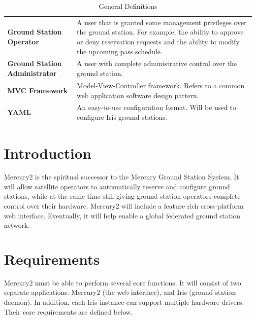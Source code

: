 \documentclass{mxl-note}
\begin{document}
\begin{table}[h]
{\begin{tabular}{ p{5cm} p{10cm} }
		\textbf{Ground Station Operator} & A user that is granted some management privileges over the ground station. For example, the ability to approve or deny reservation requests and the ability to modify the upcoming pass schedule.\\[.2cm]
		\textbf{Ground Station Administrator} & A user with complete administrative control over the ground station.\\[.2cm]
		\textbf{MVC Framework} & Model-View-Controller framework. Refers to a common web application software design pattern.\\[.2cm]
		\textbf{YAML} & An easy-to-use configuration format. Will be used to configure Iris ground stations.\\[.2cm]
	\end{tabular}}
	\caption{General Definitions}
	\label{tab:myfirsttable}
\end{table}

\newpage
\section{Introduction}
Mercury2 is the spiritual successor to the Mercury Ground Station System. It will allow satellite operators to automatically reserve and configure ground stations, while at the same time still giving ground station operators complete control over their hardware. Mercury2 will include a feature rich cross-platform web interface. Eventually, it will help enable a global federated ground station network.

\section{Requirements}
Mercury2 must be able to perform several core functions. It will consist of two separate applications: Mercury2 (the web interface), and Iris (ground station daemon). In addition, each Iris instance can support multiple hardware drivers. Their core requirements are defined below.
\end{document}
